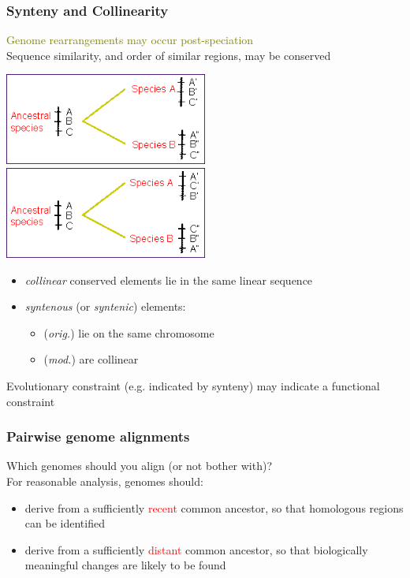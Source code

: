 %
\begin{frame}
  \frametitle{Synteny and Collinearity}
  \textcolor{olive}{Genome rearrangements may occur post-speciation} \\
  Sequence similarity, and order of similar regions, may be conserved
  \begin{center}
    \includegraphics[width=0.5\textwidth]{images/collinear}    
    \includegraphics[width=0.5\textwidth]{images/synteny}
  \end{center}    
  \begin{itemize}
    \item \textcolor{hutton_blue}{\textit{collinear}} conserved elements lie in the same linear sequence
    \item \textcolor{hutton_purple}{\textit{syntenous} (or \textit{syntenic})} elements:
    \begin{itemize}
      \item (\textit{orig.}) lie on the same chromosome
      \item (\textit{mod.}) are collinear
    \end{itemize}
  \end{itemize}
  Evolutionary constraint (e.g. indicated by synteny) may indicate a functional constraint
\end{frame}

%
\begin{frame}
  \frametitle{Pairwise genome alignments}
  \textcolor{hutton_green}{Which genomes should you align (or not bother with)?} \\
  \textcolor{RawSienna}{For reasonable analysis, genomes should}:
  \begin{itemize}
    \item derive from a sufficiently \textcolor{red}{recent} common ancestor, so that \textcolor{hutton_purple}{homologous regions can be identified}
    \item derive from a sufficiently \textcolor{red}{distant} common ancestor, so that \textcolor{hutton_purple}{biologically meaningful changes are likely to be found}
  \end{itemize}
\end{frame}

